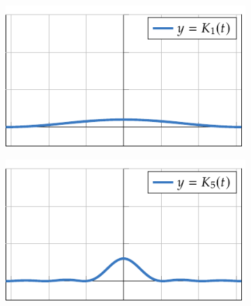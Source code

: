 \documentclass[a4paper, 11pt, oneside]{report}
\begin{document}
\begin{figure}[H]
  \centering
  \begin{subfigure}[b]{0.49\textwidth}
    \centering
    \includegraphics{./plot19/main.pdf}
  \end{subfigure}
  \begin{subfigure}[b]{0.49\textwidth}
    \centering
    \includegraphics{./plot20/main.pdf}
  \end{subfigure}
\end{figure}
\end{document}
